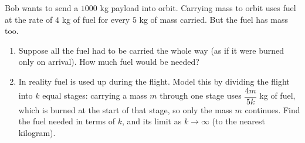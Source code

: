 Bob wants to send a $1000$ kg payload into orbit. Carrying mass to orbit uses fuel at the rate of $4$ kg of fuel for every $5$ kg of mass carried. But the fuel has mass too.
\begin{enumerate}
\item[(a)] Suppose all the fuel had to be carried the whole way (as if it were burned only on arrival). How much fuel would be needed?
\item[(b)] In reality fuel is used up during the flight. Model this by dividing the flight into $k$ equal stages: carrying a mass $m$ through one stage uses $\dfrac{4m}{5k}$ kg of fuel, which is burned at the start of that stage, so only the mass $m$ continues. Find the fuel needed in terms of $k$, and its limit as $k\to\infty$ (to the nearest kilogram).
\end{enumerate}
